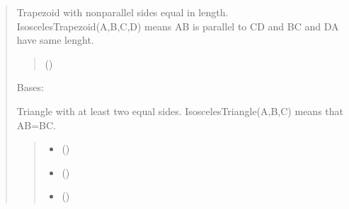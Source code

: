 \documentclass[letterpaper,10pt,english]{sphinxmanual}
\begin{document}
\begin{quote}
\begin{fulllineitems}
\sphinxAtStartPar
Trapezoid with non\sphinxhyphen{}parallel sides equal in length. IsoscelesTrapezoid(A,B,C,D) means AB is parallel to CD and BC and DA have same lenght.
\begin{quote}\begin{description}
\sphinxAtStartPar
{} ()

\end{description}\end{quote}

\end{fulllineitems}


\begin{fulllineitems}
\label{\detokenize{pygeox:pygeox.custom_objects.IsoscelesTriangle}}
\pysigstartsignatures
\pysiglinewithargsret
{}
{\sphinxparamcomma {}\sphinxparamcomma {}\sphinxparamcomma {}\sphinxparamcomma {}\sphinxparamcomma {}}
{}
\pysigstopsignatures
\sphinxAtStartPar
Bases: 

\sphinxAtStartPar
Triangle with at least two equal sides. IsoscelesTriangle(A,B,C) means that AB=BC.
\begin{quote}\begin{description}
\begin{itemize}
\item {} 
\sphinxAtStartPar
{} ()

\item {} 
\sphinxAtStartPar
{} ()

\item {} 
\sphinxAtStartPar
{} ()


\end{itemize}
\end{description}
\end{quote}
\end{fulllineitems}
\end{quote}
\end{document}
